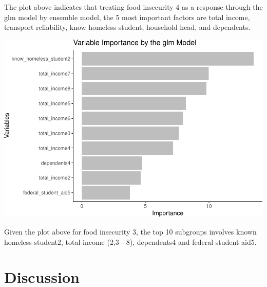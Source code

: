 \documentclass[
  10pt,
]{article}
\begin{document}
\hfill\break
The plot above indicates that treating food insecurity 4 as a response through the glm model by ensemble model, the 5 most important factors are total income, transport reliability, know homeless student, household head, and dependents.\\

\begin{center}\includegraphics{phase2_report_files/figure-latex/unnamed-chunk-32-1} \end{center}

\hfill\break
Given the plot above for food insecurity 3, the top 10 subgroups involves known homeless student2, total income (2,3 - 8), dependents4 and federal student aid5.

\hypertarget{discussion}{%
\section{Discussion}\label{discussion}}
\end{document}
